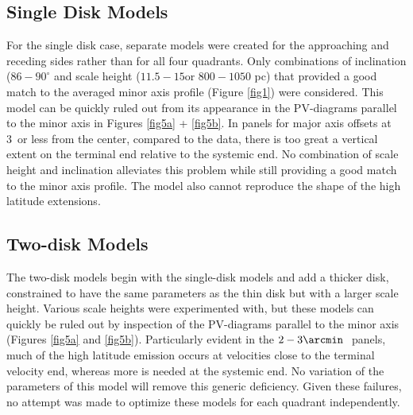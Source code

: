 \documentclass[useAMS,usenatbib]{mn2e}
\begin{document}
\subsection{Single Disk Models} \label{U20821d}
For the single disk case, separate models were created for the
approaching and receding sides rather than for all four quadrants.
Only combinations of inclination ($86-90^{\circ}$ and scale height
($11.5-15$\arcsec or $800-1050$ pc) that provided a good match to the averaged minor axis
profile (Figure \ref{fig1}) were considered.  This model can be quickly ruled out from its
appearance in the PV-diagrams parallel to the minor axis in Figures \ref{fig5a} + \ref{fig5b}.  In panels for major axis offsets at 3\arcmin\ 
or less from the center, compared to the data, there is too great a
vertical extent on the terminal end relative to the systemic end.  No
combination of scale height and inclination alleviates this problem
while still providing a good match to the minor axis profile.  The model
also cannot reproduce the shape of the high latitude extensions.\\
\subsection{Two-disk Models} \label{U20822d}
The two-disk models begin with the single-disk models and add a thicker
disk, constrained to have the same parameters as the thin disk but
with a larger scale height.  Various scale heights were experimented
with, but these models can quickly be ruled out by inspection of the
PV-diagrams parallel to the minor axis (Figures \ref{fig5a} and \ref{fig5b}).  Particularly
evident in the $2-3\arcmin\ $ panels, much of the high latitude emission occurs at velocities
close to the terminal velocity end, whereas more is needed at the
systemic end.  No variation of the parameters of this model will
remove this generic deficiency.  Given these failures, no attempt was
made to optimize these models for each quadrant independently.\\
\end{document}
